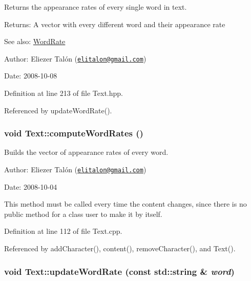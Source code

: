 Returns the appearance rates of every single word in text. 

\begin{Desc}
\item[Returns:]A vector with every different word and their appearance rate\end{Desc}
\begin{Desc}
\item[See also:]\hyperlink{_word_rate_8hpp_8cfef8793106ac45a83059bd5573cbb3}{WordRate}\end{Desc}
\begin{Desc}
\item[Author:]Eliezer Talón (\href{mailto:elitalon@gmail.com}{\tt elitalon@gmail.com}) \end{Desc}
\begin{Desc}
\item[Date:]2008-10-08 \end{Desc}


Definition at line 213 of file Text.hpp.

Referenced by updateWordRate().\hypertarget{class_text_8239e13039bcc1c713f66f1236693706}{
\subsubsection[computeWordRates]{\setlength{\rightskip}{0pt plus 5cm}void Text::computeWordRates ()}}
\label{class_text_8239e13039bcc1c713f66f1236693706}


Builds the vector of appearance rates of every word. 

\begin{Desc}
\item[Author:]Eliezer Talón (\href{mailto:elitalon@gmail.com}{\tt elitalon@gmail.com}) \end{Desc}
\begin{Desc}
\item[Date:]2008-10-04\end{Desc}
This method must be called every time the content changes, since there is no public method for a class user to make it by itself. 

Definition at line 112 of file Text.cpp.

Referenced by addCharacter(), content(), removeCharacter(), and Text().\hypertarget{class_text_5ab8f9bfa566de537a167991fe10eff5}{
\subsubsection[updateWordRate]{\setlength{\rightskip}{0pt plus 5cm}void Text::updateWordRate (const std::string \& {\em word})}}
\label{class_text_5ab8f9bfa566de537a167991fe10eff5}


